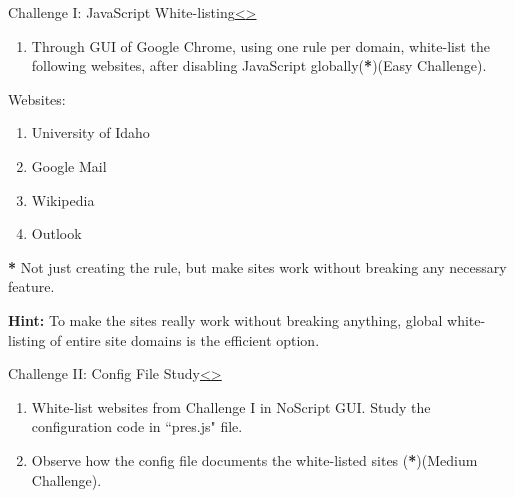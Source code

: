 \documentclass[12pt]{extarticle}
\newenvironment{instructionblock}{\Large\bgroup}{\egroup}
\newcommand{\ben}{\begin{enumerate}}
\newcommand{\een}{\end{enumerate}}
\begin{document}
	\pagebreak
	\begin{slide}{Challenge I: JavaScript White-listing}{\hyperref[slide 16]{\textless}\hyperref[slide 18]{\textgreater}}
		\begin{instructionblock}
			\begin{enumerate}
				\item Through GUI of Google Chrome, using one rule per domain, white-list the following websites, after disabling JavaScript globally(\textbf{*})(Easy Challenge). 
			\end{enumerate}
			Websites:	
			\ben
			\item University of Idaho
			\item Google Mail
			\item Wikipedia
			\item Outlook
			\een
		\end{instructionblock}
	\end{slide}
	
	\vspace{4mm}
	\noindent
	\textbf{*} Not just creating the rule, but make sites work without breaking any necessary feature.
	
	\vspace{4mm}
	\noindent
	\textbf{Hint:} To make the sites really work without breaking anything, global white-listing of entire site domains is the efficient option.	
	
	
	

	

	
	
	\pagebreak
	\begin{slide}{Challenge II: Config File Study}{\hyperref[slide 17]{\textless}\hyperref[slide 19]{\textgreater}}
		\begin{instructionblock}
			\begin{enumerate}
				\item White-list websites from Challenge I in NoScript GUI. Study the configuration code in ``pres.js" file. 
				\item Observe how the config file documents the white-listed sites (\textbf{*})(Medium Challenge). 
			\end{enumerate}
		\end{instructionblock}
	\end{slide}
	
\end{document}
